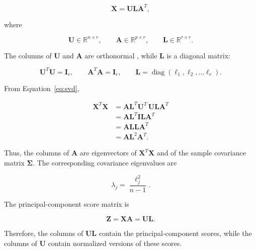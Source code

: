 \documentclass[english]{pwr_wmat_praca_dyplomowa}
\theoremstyle{definition}
\theoremstyle{remark}
\begin{document}
\begin{equation}
    \mathbf{X} = \mathbf{U} \mathbf{L} \mathbf{A}^T,
    \label{eq:svd}
\end{equation}

where

\begin{equation}
    \mathbf{U} \in \mathbb{R}^{n\times r}, \qquad \mathbf{A} \in \mathbb{R}^{p\times r}, \qquad \mathbf{L} \in \mathbb{R}^{r\times r}.
\end{equation}

The columns of $\mathbf{U}$ and $\mathbf{A}$ are orthonormal \cite[Section 3.5]{pca}, while $\mathbf{L}$ is a diagonal matrix:

\begin{equation}
    \mathbf{U}^T\mathbf{U} = \mathbf{I}_r, \qquad \mathbf{A}^T\mathbf{A} = \mathbf{I}_r, \qquad \mathbf{L} = \operatorname{diag} \left(\ell_1, \ell_2, \ldots \ell_r\right).
\end{equation}

From Equation~\eqref{eq:svd},

\begin{equation}
    \begin{aligned}
        \mathbf{X}^T\mathbf{X} 
        &= \mathbf{A} \mathbf{L}^T \mathbf{U}^T  \, \mathbf{U} \mathbf{L} \mathbf{A}^T  \\
        &= \mathbf{A} \mathbf{L}^T \mathbf{I} \mathbf{L} \mathbf{A}^T \\
        &= \mathbf{A} \mathbf{L} \mathbf{L} \mathbf{A}^T \\
        &= \mathbf{A} \mathbf{L}^2 \mathbf{A}^T. 
    \end{aligned}
\end{equation}

Thus, the columns of $\mathbf{A}$ are eigenvectors of $\mathbf{X}^T\mathbf{X}$ and of the sample covariance matrix $\boldsymbol{\Sigma}$. The corresponding covariance eigenvalues are

\begin{equation}
    \lambda_j = \frac{\ell_j^2}{n-1}.
\end{equation}

The principal-component score matrix is

\begin{equation}
    \mathbf{Z} = \mathbf{X}\mathbf{A} = \mathbf{U}\mathbf{L}.
\end{equation}

Therefore, the columns of $\mathbf{U}\mathbf{L}$ contain the principal-component scores, while the columns of $\mathbf{U}$ contain normalized versions of these scores.
\end{document}
